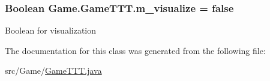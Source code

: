 \subsubsection[{m\+\_\+visualize}]{\setlength{\rightskip}{0pt plus 5cm}Boolean Game.\+Game\+T\+T\+T.\+m\+\_\+visualize = false\hspace{0.3cm}{\ttfamily [private]}}\label{class_game_1_1_game_t_t_t_ad1efe890e60af4826d664276e1e49ea4}
Boolean for visualization 

The documentation for this class was generated from the following file\+:\begin{DoxyCompactItemize}
\item 
src/\+Game/\hyperlink{_game_t_t_t_8java}{Game\+T\+T\+T.\+java}\end{DoxyCompactItemize}
